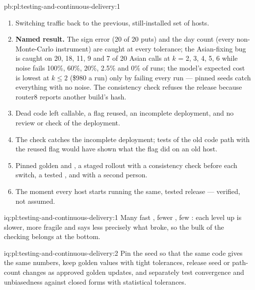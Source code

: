\begin{solution}{pb:pl:testing-and-continuous-delivery:1}
\begin{enumerate}
manner, with testing in an environment separated from production.
\item Switching traffic back to the previous, still-installed set of hosts.
\item \textbf{Named result.} The sign error (20 of 20 puts) and the day count (every non-Monte-Carlo instrument) are caught at every
tolerance; the Asian-fixing bug is caught on 20, 18, 11, 9 and 7 of 20 Asian calls at $k$ = 2, 3, 4, 5, 6 while noise fails 100\%, 60\%, 20\%,
2.5\% and 0\% of runs; the model's expected cost is lowest at $k\le2$ (\$980 a run) only by failing every run --- pinned seeds catch everything
with no noise. The consistency check refuses the release because router8 reports another build's hash.
\item Dead code left callable, a flag reused, an incomplete deployment, and no review or check of the deployment.
\item The check catches the incomplete deployment; tests of the old code path with the reused flag would have shown what the flag did on an
old host.
\item Pinned golden and , a staged rollout with a consistency check before each switch, a tested , and  with a second person.
\item The moment every host starts running the same, tested release --- verified, not assumed.
\end{enumerate}
\end{solution}

\begin{solution}{iq:pl:testing-and-continuous-delivery:1}
Many fast , fewer , few : each level up is slower, more fragile and says less precisely what broke,
so the bulk of the checking belongs at the bottom.
\end{solution}

\begin{solution}{iq:pl:testing-and-continuous-delivery:2}
Pin the seed so that the same code gives the same numbers, keep golden values with tight tolerances, release seed or path-count changes as
approved golden updates, and separately test convergence and unbiasedness against closed forms with statistical tolerances.
\end{solution}

